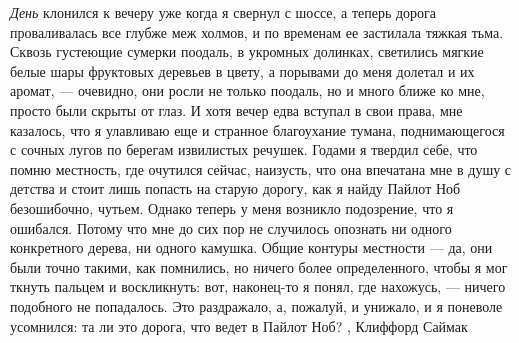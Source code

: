 \emph{День} клонился к вечеру уже когда я свернул с шоссе, а теперь дорога
проваливалась все глубже меж холмов, и по временам ее застилала тяжкая тьма.
Сквозь густеющие сумерки поодаль, в укромных долинках, светились мягкие белые
шары фруктовых деревьев в цвету, а порывами до меня долетал и их аромат, —
очевидно, они росли не только поодаль, но и много ближе ко мне, просто были
скрыты от глаз. И хотя вечер едва вступал в свои права, мне казалось, что я
улавливаю еще и странное благоухание тумана, поднимающегося с сочных лугов по
берегам извилистых речушек.  Годами я твердил себе, что помню местность, где
очутился сейчас, наизусть, что она впечатана мне в душу с детства и стоит лишь
попасть на старую дорогу, как я найду Пайлот Ноб безошибочно, чутьем. Однако
теперь у меня возникло подозрение, что я ошибался. Потому что мне до сих пор не
случилось опознать ни одного конкретного дерева, ни одного камушка. Общие
контуры местности — да, они были точно такими, как помнились, но ничего более
определенного, чтобы я мог ткнуть пальцем и воскликнуть: вот, наконец-то я
понял, где нахожусь, — ничего подобного не попадалось. Это раздражало, а,
пожалуй, и унижало, и я поневоле усомнился: та ли это дорога, что ведет в
Пайлот Ноб?
, Клиффорд Саймак
